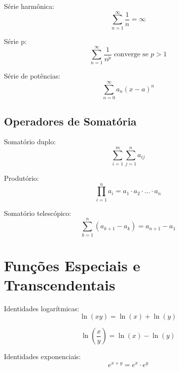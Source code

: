 Série harmônica:
\begin{equation}
\sum_{n=1}^{\infty} \frac{1}{n} = \infty
\end{equation}

Série p:
\begin{equation}
\sum_{n=1}^{\infty} \frac{1}{n^p} \text{ converge se } p > 1
\end{equation}

Série de potências:
\begin{equation}
\sum_{n=0}^{\infty} a_n(x-a)^n
\end{equation}

\subsection{Operadores de Somatória}

Somatório duplo:
\begin{equation}
\sum_{i=1}^{m} \sum_{j=1}^{n} a_{ij}
\end{equation}

Produtório:
\begin{equation}
\prod_{i=1}^{n} a_i = a_1 \cdot a_2 \cdot \ldots \cdot a_n
\end{equation}

Somatório telescópico:
\begin{equation}
\sum_{k=1}^{n} (a_{k+1} - a_k) = a_{n+1} - a_1
\end{equation}


\section{Funções Especiais e Transcendentais}

Identidades logarítmicas:
\begin{equation}
\ln(xy) = \ln(x) + \ln(y)
\end{equation}

\begin{equation}
\ln\left(\frac{x}{y}\right) = \ln(x) - \ln(y)
\end{equation}

Identidades exponenciais:
\begin{equation}
e^{x+y} = e^x \cdot e^y
\end{equation}

